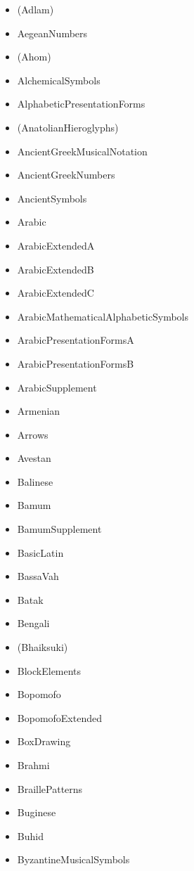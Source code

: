 \documentclass{article}
\newenvironment{itemlist}{%
  \begin{itemize}
  \setlength{\itemsep}{0pt}
  \setlength{\parsep}{0pt}
  \setlength{\topsep}{0pt}
  \setlength{\partopsep}{0pt}
  \setlength{\parskip}{0pt}
  \setlength{\labelsep}{5pt}}%
{
  \end{itemize}}
\begin{document}
    \begin{multicols*}{2}
      \begin{itemlist}
        \item (Adlam)
        \item AegeanNumbers
        \item (Ahom)
        \item AlchemicalSymbols
        \item AlphabeticPresentationForms
        \item (AnatolianHieroglyphs)
        \item AncientGreekMusicalNotation
        \item AncientGreekNumbers
        \item AncientSymbols
        \item Arabic
        \item ArabicExtendedA
        \item ArabicExtendedB
        \item ArabicExtendedC
        \item ArabicMathematicalAlphabeticSymbols
        \item ArabicPresentationFormsA
        \item ArabicPresentationFormsB
        \item ArabicSupplement
        \item Armenian
        \item Arrows
        \item Avestan
        \item Balinese
        \item Bamum
        \item BamumSupplement
        \item BasicLatin
        \item BassaVah
        \item Batak
        \item Bengali
        \item (Bhaiksuki)
        \item BlockElements
        \item Bopomofo
        \item BopomofoExtended
        \item BoxDrawing
        \item Brahmi
        \item BraillePatterns
        \item Buginese
        \item Buhid
        \item ByzantineMusicalSymbols

\end{itemlist}
\end{multicols*}
\end{document}
